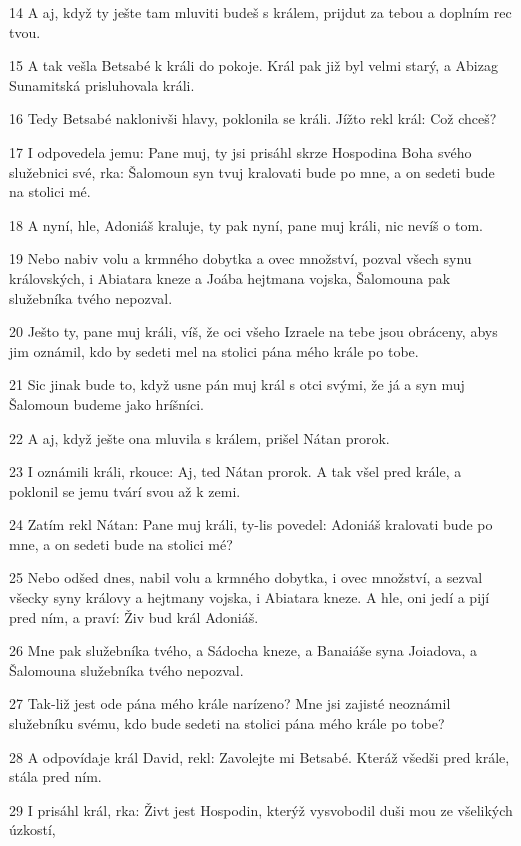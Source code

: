 \par 14 A aj, když ty ješte tam mluviti budeš s králem, prijdut za tebou a doplním rec tvou.
\par 15 A tak vešla Betsabé k králi do pokoje. Král pak již byl velmi starý, a Abizag Sunamitská prisluhovala králi.
\par 16 Tedy Betsabé naklonivši hlavy, poklonila se králi. Jížto rekl král: Což chceš?
\par 17 I odpovedela jemu: Pane muj, ty jsi prisáhl skrze Hospodina Boha svého služebnici své, rka: Šalomoun syn tvuj kralovati bude po mne, a on sedeti bude na stolici mé.
\par 18 A nyní, hle, Adoniáš kraluje, ty pak nyní, pane muj králi, nic nevíš o tom.
\par 19 Nebo nabiv volu a krmného dobytka a ovec množství, pozval všech synu královských, i Abiatara kneze a Joába hejtmana vojska, Šalomouna pak služebníka tvého nepozval.
\par 20 Ješto ty, pane muj králi, víš, že oci všeho Izraele na tebe jsou obráceny, abys jim oznámil, kdo by sedeti mel na stolici pána mého krále po tobe.
\par 21 Sic jinak bude to, když usne pán muj král s otci svými, že já a syn muj Šalomoun budeme jako hríšníci.
\par 22 A aj, když ješte ona mluvila s králem, prišel Nátan prorok.
\par 23 I oznámili králi, rkouce: Aj, ted Nátan prorok. A tak všel pred krále, a poklonil se jemu tvárí svou až k zemi.
\par 24 Zatím rekl Nátan: Pane muj králi, ty-lis povedel: Adoniáš kralovati bude po mne, a on sedeti bude na stolici mé?
\par 25 Nebo odšed dnes, nabil volu a krmného dobytka, i ovec množství, a sezval všecky syny královy a hejtmany vojska, i Abiatara kneze. A hle, oni jedí a pijí pred ním, a praví: Živ bud král Adoniáš.
\par 26 Mne pak služebníka tvého, a Sádocha kneze, a Banaiáše syna Joiadova, a Šalomouna služebníka tvého nepozval.
\par 27 Tak-liž jest ode pána mého krále narízeno? Mne jsi zajisté neoznámil služebníku svému, kdo bude sedeti na stolici pána mého krále po tobe?
\par 28 A odpovídaje král David, rekl: Zavolejte mi Betsabé. Kteráž všedši pred krále, stála pred ním.
\par 29 I prisáhl král, rka: Živt jest Hospodin, kterýž vysvobodil duši mou ze všelikých úzkostí,
